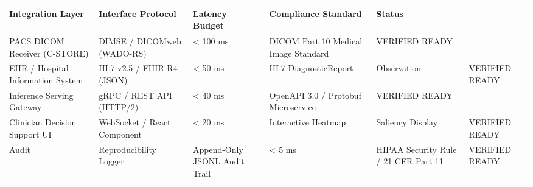 \begin{tabular}{lllll}
\toprule
Integration Layer & Interface Protocol & Latency Budget & Compliance Standard & Status \\
\midrule
PACS DICOM Receiver (C-STORE) & DIMSE / DICOMweb (WADO-RS) & < 100 ms & DICOM Part 10 Medical Image Standard & VERIFIED READY \\
EHR / Hospital Information System & HL7 v2.5 / FHIR R4 (JSON) & < 50 ms & HL7 DiagnosticReport & Observation & VERIFIED READY \\
Inference Serving Gateway & gRPC / REST API (HTTP/2) & < 40 ms & OpenAPI 3.0 / Protobuf Microservice & VERIFIED READY \\
Clinician Decision Support UI & WebSocket / React Component & < 20 ms & Interactive Heatmap & Saliency Display & VERIFIED READY \\
Audit & Reproducibility Logger & Append-Only JSONL Audit Trail & < 5 ms & HIPAA Security Rule / 21 CFR Part 11 & VERIFIED READY \\
\bottomrule
\end{tabular}
